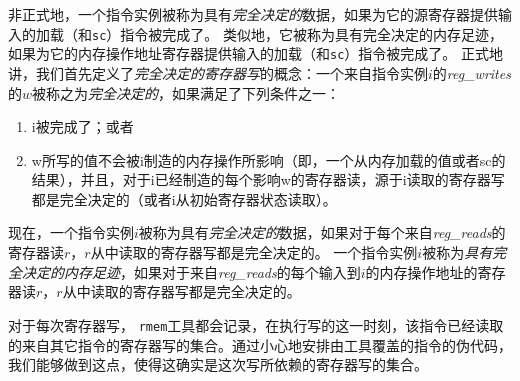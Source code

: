 非正式地，一个指令实例被称为具有{\it 完全决定的}数据，如果为它的源寄存器提供输入的加载（和{\tt sc}）指令被完成了。
类似地，它被称为具有完全决定的内存足迹，如果为它的内存操作地址寄存器提供输入的加载（和{\tt sc}）指令被完成了。
正式地讲，我们首先定义了{\it 完全决定的寄存器写}的概念：一个来自指令实例$i$的{\it reg\_writes}的$w$被称之为{\it 完全决定的}，如果满足了下列条件之一：
%
\begin{enumerate}
\item i被完成了；或者 %
\item w所写的值不会被i制造的内存操作所影响（即，一个从内存加载的值或者sc的结果），并且，对于i已经制造的每个影响w的寄存器读，源于i读取的寄存器写都是完全决定的（或者i从初始寄存器状态读取）。 
\end{enumerate}
现在，一个指令实例$i$被称为具有{\it 完全决定的}数据，如果对于每个来自{\it reg\_reads}的寄存器读$r$，$r$从中读取的寄存器写都是完全决定的。
一个指令实例$i$被称为{\it 具有完全决定的内存足迹}，如果对于来自{\it reg\_reads}的每个输入到$i$的内存操作地址的寄存器读$r$，$r$从中读取的寄存器写都是完全决定的。
\begin{commentary}
  对于每次寄存器写， {\tt rmem}工具都会记录，在执行写的这一时刻，该指令已经读取的来自其它指令的寄存器写的集合。通过小心地安排由工具覆盖的指令的伪代码，我们能够做到这点，使得这确实是这次写所依赖的寄存器写的集合。
\end{commentary}



